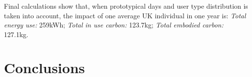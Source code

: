 \documentclass[conference]{IEEEtran}
\begin{document}

Final calculations show that, when prototypical days and user type
distribution is taken into account, the impact of one average UK
individual in one year is: {\emph{Total energy use:}} 259kWh;
{\emph{Total in use carbon:}} 123.7kg; {\emph{Total embodied carbon:}}
127.1kg.







\section{Conclusions}



\end{document}
